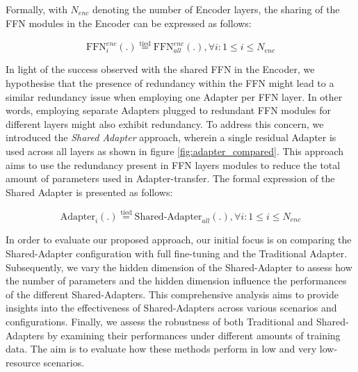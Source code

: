 Formally, with $N_{enc}$ denoting the number of Encoder layers, the sharing of the \ac{FFN} modules in the Encoder can be expressed as follows:

\begin{equation}
    \text{FFN}_{i}^{enc}(.) \stackrel{\text{tied}}{=} \text{FFN}^{enc}_{all}(.) , \forall i: 1 \leq i \leq N_{enc}
\end{equation}

In light of the success observed with the shared \ac{FFN} in the Encoder, we hypothesise that the presence of redundancy within the \ac{FFN} might lead to a similar redundancy issue when employing one Adapter per \ac{FFN} layer. In other words, employing separate Adapters plugged to redundant \ac{FFN} modules for different layers might also exhibit redundancy. To address this concern, we introduced the \textit{Shared Adapter} approach, wherein a single residual Adapter is used across all layers as shown in figure \ref{fig:adapter_compared}. This approach aims to use the redundancy present in \ac{FFN} layers modules to reduce the total amount of parameters used in Adapter-transfer. The formal expression of the Shared Adapter is presented as follows:

\begin{equation}
    \text{Adapter}_{i}(.) \stackrel{\text{tied}}{=} \text{Shared-Adapter}_{all}(.) , \forall i: 1 \leq i \leq N_{enc}
\end{equation}

In order to evaluate our proposed approach, our initial focus is on comparing the Shared-Adapter configuration with full fine-tuning and the Traditional Adapter. Subsequently, we vary the hidden dimension of the Shared-Adapter to assess how the number of parameters and the hidden dimension influence the performances of the different Shared-Adapters. This comprehensive analysis aims to provide insights into the effectiveness of Shared-Adapters across various scenarios and configurations. Finally, we assess the robustness of both Traditional and Shared-Adapters by examining their performances under different amounts of training data. The aim is to evaluate how these methods perform in low and very low-resource scenarios.

